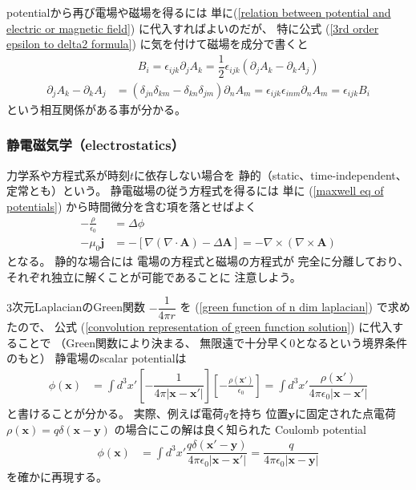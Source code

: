 potentialから再び電場や磁場を得るには
単に(\ref{relation between potential and electric or magnetic field})
に代入すればよいのだが、
特に公式
(\ref{3rd order epsilon to delta2 formula})
に気を付けて磁場を成分で書くと
\begin{subequations}
\begin{align}
  & \qquad B_i =
  \epsilon_{ijk} \partial_j A_k
=
  \dfrac{1}{2}
  \epsilon_{ijk}
  ( \partial_j A_k
  - \partial_k A_j )
\\
  \partial_j A_k - \partial_k A_j
&=
  (\delta_{jn} \delta_{km}
  - \delta_{kn} \delta_{jm})
  \partial_n A_m
=
  \epsilon_{ijk} \epsilon_{inm}
  \partial_n A_m
=
  \epsilon_{ijk} B_i
\end{align}
\label{field strength and magnetic field}
\end{subequations}
という相互関係がある事が分かる。

\subsubsection{静電磁気学（electrostatics）}

力学系や方程式系が時刻$t$に依存しない場合を
静的（static、time-independent、定常とも）という。
静電磁場の従う方程式を得るには
単に
(\ref{maxwell eq of potentials})
から時間微分を含む項を落とせばよく
\begin{subequations}
\begin{align}
  - \frac{\rho}{\epsilon_0}
&=
  \Delta \phi
\label{static eq for ele-mag scalar potential}
\\
  - \mu_0 \bm{j}
&=
  - [
    \nabla
    ( \nabla \cdot \bm{A} )
  -
    \Delta \bm{A}
  ]
=
  - \nabla \times
    (\nabla \times \bm{A})
\label{static eq for ele-mag vector potential}
\end{align}
\end{subequations}
となる。
静的な場合には
電場の方程式と磁場の方程式が
完全に分離しており、
それぞれ独立に解くことが可能であることに
注意しよう。

$3$次元LaplacianのGreen関数
$ - \dfrac{1}{4 \pi r} $
を
(\ref{green function of n dim laplacian})
で求めたので、
公式
(\ref{convolution representation of green function solution})
に代入することで
（Green関数により決まる、
無限遠で十分早く$0$となるという境界条件のもと）
静電場のscalar potentialは
\begin{align}
  \phi (\bm{x})
&=
  \int d^3 x'
  \left[
    - \dfrac{1}{
      4 \pi |\bm{x} - \bm{x}'|
    }
  \right]
  \left[
    - \frac{\rho(\bm{x}')}{\epsilon_0}
  \right]
=
  \int d^3 x'
    \dfrac{\rho(\bm{x}')}{
      4 \pi \epsilon_0
      |\bm{x} - \bm{x}'|
    }
\end{align}
と書けることが分かる。
実際、例えば電荷$q$を持ち
位置$\bm{y}$に固定された点電荷
$\rho(\bm{x})
= q \delta(\bm{x} - \bm{y})$
の場合にこの解は良く知られた
Coulomb potential
\begin{align}
  \phi (\bm{x})
&=
  \int d^3 x'
    \dfrac{
      q \delta(\bm{x}' - \bm{y})
    }{
      4 \pi \epsilon_0
      |\bm{x} - \bm{x}'|
    }
=
    \dfrac{ q }{
      4 \pi \epsilon_0
      |\bm{x} - \bm{y}|
    }
\label{coulomb potential of point charge}
\end{align}
を確かに再現する。


